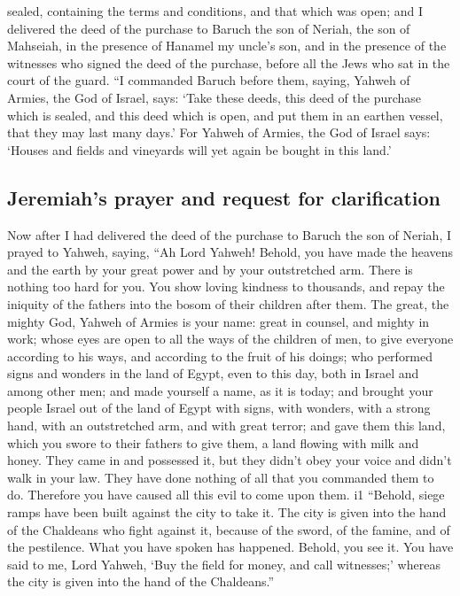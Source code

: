sealed, containing the terms and conditions, and that which was open;
 and I delivered the deed of the purchase to Baruch the
son of Neriah, the son of Mahseiah, in the presence of Hanamel my
uncle's son, and in the presence of the witnesses who signed the deed of
the purchase, before all the Jews who sat in the court of the guard.
 ``I commanded Baruch before them, saying,
 Yahweh of Armies, the God of Israel, says: `Take these
deeds, this deed of the purchase which is sealed, and this deed which is
open, and put them in an earthen vessel, that they may last many days.'
 For Yahweh of Armies, the God of Israel says: `Houses
and fields and vineyards will yet again be bought in this land.'

\hypertarget{jeremiahs-prayer-and-request-for-clarification}{%
\subsection{Jeremiah's prayer and request for
clarification}\label{jeremiahs-prayer-and-request-for-clarification}}

 Now after I had delivered the deed of the purchase to
Baruch the son of Neriah, I prayed to Yahweh, saying, 
``Ah Lord Yahweh! Behold, you have made the heavens and the earth by
your great power and by your outstretched arm. There is nothing too hard
for you.  You show loving kindness to thousands, and
repay the iniquity of the fathers into the bosom of their children after
them. The great, the mighty God, Yahweh of Armies is your name:
 great in counsel, and mighty in work; whose eyes are
open to all the ways of the children of men, to give everyone according
to his ways, and according to the fruit of his doings; 
who performed signs and wonders in the land of Egypt, even to this day,
both in Israel and among other men; and made yourself a name, as it is
today;  and brought your people Israel out of the land of
Egypt with signs, with wonders, with a strong hand, with an outstretched
arm, and with great terror;  and gave them this land,
which you swore to their fathers to give them, a land flowing with milk
and honey.  They came in and possessed it, but they
didn't obey your voice and didn't walk in your law. They have done
nothing of all that you commanded them to do. Therefore you have caused
all this evil to come upon them. i1  ``Behold, siege
ramps have been built against the city to take it. The city is given
into the hand of the Chaldeans who fight against it, because of the
sword, of the famine, and of the pestilence. What you have spoken has
happened. Behold, you see it.  You have said to me, Lord
Yahweh, `Buy the field for money, and call witnesses;' whereas the city
is given into the hand of the Chaldeans.''

